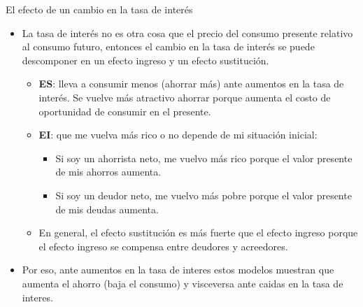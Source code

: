 \documentclass{beamer}
\begin{document}
\begin{frame}{El efecto de un cambio en la tasa de interés}
    \begin{itemize}
        \item La tasa de interés no es otra cosa que el precio del consumo presente relativo al consumo futuro, entonces el cambio en la tasa de interés se puede descomponer en un efecto ingreso y un efecto sustitución.
        \begin{itemize}
            \item \textbf{ES}: lleva a consumir menos (ahorrar más) ante aumentos en la tasa de interés. Se vuelve más atractivo ahorrar porque aumenta el costo de oportunidad de consumir en el presente.
            \item \textbf{EI}: que me vuelva más rico o no depende de mi situación inicial:
            \begin{itemize}
                \item Si soy un ahorrista neto, me vuelvo más rico porque el valor presente de mis ahorros aumenta.
                \item Si soy un deudor neto, me vuelvo más pobre porque el valor presente de mis deudas aumenta.
            \end{itemize}
            \item En general, el efecto sustitución es más fuerte que el efecto ingreso porque el efecto ingreso se compensa entre deudores y acreedores.
        \end{itemize}
        \item Por eso, ante aumentos en la tasa de interes estos modelos muestran que aumenta el ahorro (baja el consumo) y visceversa ante caidas en la tasa de interes.
    \end{itemize}
\end{frame}
\end{document}
